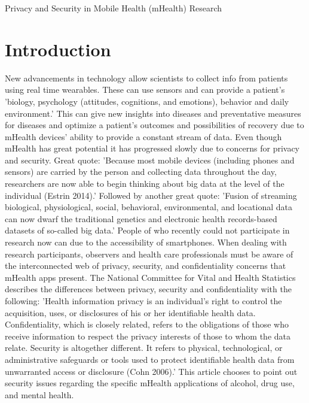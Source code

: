 \documentclass{article}
\begin{document}
\begin{center}
\Huge Privacy and Security in Mobile Health (mHealth) Research
\end{center}
\section*{Introduction}
New advancements in technology allow scientists to collect info from patients using real time wearables. These can use sensors and can provide a patient's 'biology, psychology (attitudes, cognitions, and emotions), behavior and daily environment.' This can give new insights into diseases and preventative measures for diseases and optimize a patient's outcomes and possibilities of recovery due to mHealth devices' ability to provide a constant stream of data. Even though mHealth has great potential it has progressed slowly due to concerns for privacy and security. Great quote: 'Because most mobile devices (including phones and sensors) are carried by the person and collecting data throughout the day, researchers are now able to begin thinking about big data at the level of the individual (Estrin 2014).' Followed by another great quote: 'Fusion of streaming biological, physiological, social, behavioral, environmental, and locational data can now dwarf the traditional genetics and electronic health records-based datasets of so-called big data.' People of who recently could not participate in research now can due to the accessibility of smartphones. When dealing with research participants, observers and health care professionals must be aware of the interconnected web of privacy, security, and confidentiality concerns that mHealth apps present. The National Committee for Vital and Health Statistics describes the differences between privacy, security and confidentiality with the following: 'Health information privacy is an individual’s right to control the acquisition, uses, or disclosures of his or her identifiable health data. Confidentiality, which is closely related, refers to the obligations of those who receive information to respect the privacy interests of those to whom the data relate. Security is altogether different. It refers to physical, technological, or administrative safeguards or tools used to protect identifiable health data from unwarranted access or disclosure (Cohn 2006).' This article chooses to point out security issues regarding the specific mHealth applications of alcohol, drug use, and mental health. 
\end{document}
